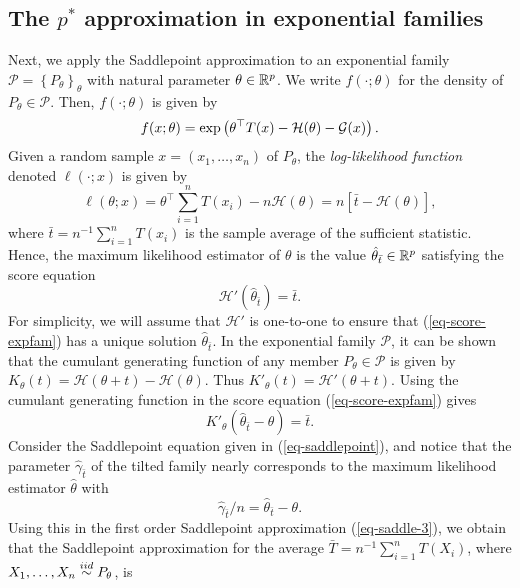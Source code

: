 \subsection{The $p^*$ approximation in exponential families} \label{sec-pstar}

Next, we apply the Saddlepoint approximation to an exponential family $\mathcal{P} = \left\{P_\theta\right\}_{\theta}$ with natural parameter $\theta \in {\mathbb{R}^p}$. We write $f(\cdot; \theta)$ for the density of $P_\theta \in \mathcal{P}$. Then, $f(\cdot; \theta)$ is given by
\begin{equation*}
    f(x; \theta) = \exp\left(\theta^\top T(x) - \mathcal{H}(\theta) - \mathcal{G}(x)\right).
\end{equation*}
Given a random sample $x = (x_1, \ldots, x_n)$ of $P_\theta$, the \textit{log-likelihood function} denoted $\ell(\cdot; x)$ is given by
\begin{equation*}
    \ell(\theta; x) = \theta^\top \sum_{i=1}^n T(x_i) - n \mathcal{H}(\theta) = n\left[\bar t - \mathcal{H}(\theta)\right],
\end{equation*}
where $\bar t = n^{-1}\sum_{i=1}^n T(x_i)$ is the sample average of the sufficient statistic. Hence, the maximum likelihood estimator of $\theta$ is the value $\hat\theta_{\bar t} \in {\mathbb{R}^p}$ satisfying the score equation
\begin{equation} \label{eq-score-expfam}
    \mathcal{H}'(\hat\theta_{\bar t}) = \bar t.
\end{equation}
For simplicity, we will assume that $\mathcal{H}'$ is one-to-one to ensure that (\ref{eq-score-expfam}) has a unique solution $\hat\theta_{\bar t}$. In the exponential family $\mathcal{P}$, it can be shown that the cumulant generating function of any member $P_\theta \in \mathcal{P}$ is given by $K_\theta(t) = \mathcal{H}(\theta + t) - \mathcal{H}(\theta)$. Thus $K'_\theta(t) = \mathcal{H}'(\theta + t)$. Using the cumulant generating function in the score equation (\ref{eq-score-expfam}) gives
\begin{equation*}
    K'_\theta(\hat\theta_{\bar t} - \theta) = \bar t.
\end{equation*}
Consider the Saddlepoint equation given in (\ref{eq-saddlepoint}), and notice that the parameter $\hat\gamma_{\bar t}$ of the tilted family nearly corresponds to the maximum likelihood estimator $\hat\theta$ with
\begin{equation*}
    \hat\gamma_{\bar t}/n = \hat\theta_{\bar t} - \theta.
\end{equation*}
Using this in the first order Saddlepoint approximation (\ref{eq-saddle-3}), we obtain that the Saddlepoint approximation for the average $\bar T = n^{-1}\sum_{i=1}^n T(X_i)$, where $X_1, \ldots, X_n \stackrel{iid}{\sim} P_\theta$, is
